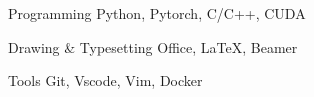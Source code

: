 \begin{cvskills}

  \cvskill
  {Programming} %
  {Python, Pytorch, C/C++, CUDA} %


  \cvskill
  {Drawing \& Typesetting} %
  {Office, \textrm{\LaTeX}, Beamer} %

  \cvskill
  {Tools} %
  {Git, Vscode, Vim, Docker} %
\end{cvskills}
